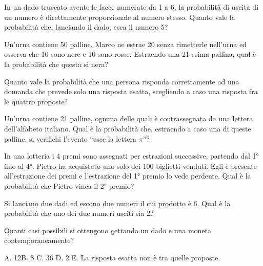 \begin{esercizio} %
In un dado truccato avente le facce numerate da 1 a 6, la probabilità di uscita 
di un numero è direttamente proporzionale al numero stesso. Quanto vale la 
probabilità che, lanciando il dado, esca il numero 5?
\end{esercizio}

\begin{esercizio} %
Un'urna contiene 50 palline. Marco ne estrae 20 senza rimetterle nell'urna ed 
osserva che 10 sono nere e 10 sono rosse. Estraendo una 21-esima pallina, qual è 
la probabilità che questa si nera?
\end{esercizio}

\begin{esercizio} %
Quanto vale la probabilità che una persona risponda correttamente ad una domanda 
che prevede solo una risposta esatta, scegliendo a caso una risposta fra le 
quattro proposte?
\end{esercizio}

\begin{esercizio} %
Un'urna contiene 21 palline, ognuna delle quali è contrassegnata da una lettera 
dell'alfabeto italiano. Qual è la probabilità che, estraendo a caso una di 
queste palline, si verifichi l'evento ``esce la lettera \( \pi \)''?
\end{esercizio}

\begin{esercizio} %
In una lotteria i 4 premi sono assegnati per estrazioni successive, partendo dal 
1° fino al 4°. Pietro ha acquistato uno solo dei 100 biglietti venduti. Egli è 
presente all'estrazione dei premi e l'estrazione del 1° premio lo vede perdente. 
Qual è la probabilità che Pietro vinca il 2° premio?
\end{esercizio}

\begin{esercizio} %
Si lanciano due dadi ed escono due numeri il cui prodotto è 6. Qual è la 
probabilità che uno dei due numeri usciti sia 2?
\end{esercizio}

\begin{esercizio} %
Quanti casi possibili si ottengono gettando un dado e una moneta 
contemporaneamente?

A. 12\quad B. 8 \quad C. 36 \quad D. 2 \quad E. La risposta esatta non è tra 
quelle proposte.
\end{esercizio}

